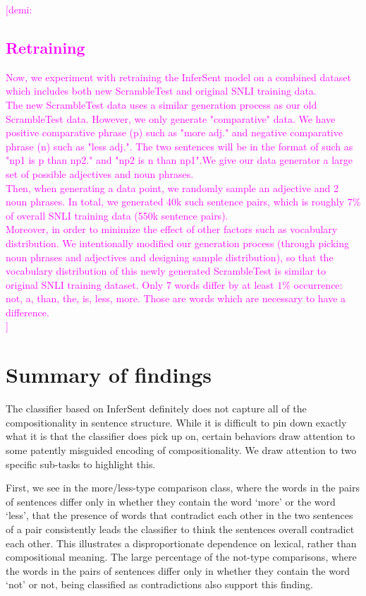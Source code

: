\documentclass[10pt,letterpaper]{article}
\newcommand{\demi}[1]{\textcolor{magenta}{[demi: #1]}}
\begin{document}
\demi{
\subsection{Retraining}
Now, we experiment with retraining the InferSent model on a combined dataset which includes both new ScrambleTest and original SNLI training data. \\
The new ScrambleTest data uses a similar generation process as our old ScrambleTest data. However, we only generate "comparative" data. We have positive comparative phrase (p) such as "more adj." and negative comparative phrase (n) such as "less adj.". The two sentences will be in the format of such as "np1 is p than np2." and "np2 is n than np1".We give our data generator a large set of possible adjectives and noun phrases. \\Then, when generating a data point, we randomly sample an adjective and 2 noun phrases. In total, we generated 40k such sentence pairs, which is roughly $7 \%$ of overall SNLI training data (550k sentence pairs).\\
Moreover, in order to minimize the effect of other factors such as vocabulary distribution. We intentionally modified our generation process (through picking noun phrases and adjectives and designing sample distribution), so that the vocabulary distribution of this newly generated ScrambleTest is similar to original SNLI training dataset. Only 7 words differ by at least $1 \%$ occurrence: not, a, than, the, is, less, more. Those are words which are necessary to have a difference.\\}




\section{Summary of findings}
The classifier based on InferSent definitely does not capture all of the compositionality in sentence structure. While it is difficult to pin down exactly what it is that the classifier does pick up on, certain behaviors draw attention to some patently misguided encoding of compositionality. We draw attention to two specific sub-tasks to highlight this. 

First, we see in the more/less-type comparison class, where the words in the pairs of sentences differ only in whether they contain the word `more' or the word `less', that the presence of words that contradict each other in the two sentences of a pair consistently leads the classifier to think the sentences overall contradict each other. This illustrates a disproportionate dependence on lexical, rather than compositional meaning. The large percentage of the not-type comparisons, where the words in the pairs of sentences differ only in whether they contain the word `not' or not, being classified as contradictions also support this finding. 
\end{document}
